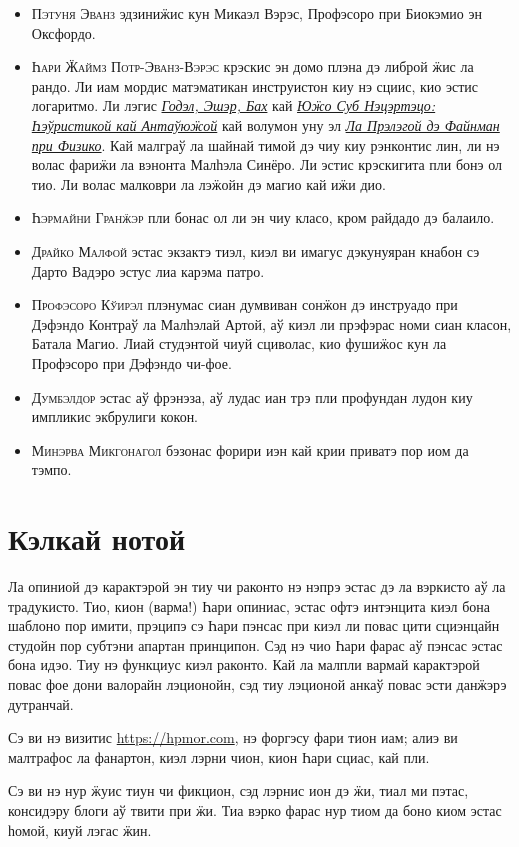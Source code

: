 \begin{itemize}
\item \textsc{Пэтуня Эванз} эдзиниӝис кун Микаэл Вэрэс, Профэсоро при Биокэмио эн Оксфордо.
\item \textsc{Һари Ӝаймз Потр-Эванз-Вэрэс} крэскис эн домо плэна дэ либрой ӝис ла рандо.
  Ли иам мордис матэматикан инструистон киу нэ сциис, кио эстис логаритмо.
  Ли лэгис \href{https://books.google.com/books?vid=ISBN9780465026562}{\emph{Годэл, Эшэр, Бах}}
  кай \href{https://books.google.com/books?vid=ISBN9780521284141}{\emph{Юӝо Суб Нэцэртэцо: Һэўристикой кай Антаўюӝой}}
  кай волумон уну эл \href{https://books.google.com/books?vid=ISBN9780201021158}{\emph{Ла Прэлэгой дэ Файнман при Физико}}.
  Кай малграў ла шайнай тимой дэ чиу киу рэнконтис лин, ли нэ волас фариӝи ла вэнонта Малһэла Синёро.
  Ли эстис крэскигита пли бонэ ол тио.
  Ли волас малковри ла лэӝойн дэ магио кай иӝи дио.
\item \textsc{Һэрмайни Гранӝэр} пли бонас ол ли эн чиу класо, кром райдадо дэ балаило.
\item \textsc{Драйко Малфой} эстас экзактэ тиэл, киэл ви имагус дэкунуяран кнабон сэ Дарто Вадэро эстус лиа карэма патро.
\item \textsc{Профэсоро Кўирэл} плэнумас сиан думвиван сонӝон дэ инструадо при Дэфэндо Контраў ла Малһэлай Артой, аў киэл ли прэфэрас номи сиан класон, Батала Магио.
  Лиай студэнтой чиуй сциволас, кио фушиӝос кун ла Профэсоро при Дэфэндо чи-фое.
\item \textsc{Думбэлдор} эстас аў фрэнэза, аў лудас иан трэ пли профундан лудон киу импликис экбрулиги кокон.
\item \textsc{Минэрва Микгонагол} бэзонас форири иэн кай крии приватэ пор иом да тэмпо.
\end{itemize}

%
%

\section*{Кэлкай нотой}

Ла опиниой дэ карактэрой эн тиу чи раконто нэ нэпрэ эстас дэ ла вэркисто аў ла традукисто.
Тио, кион (варма!) Һари опиниас, эстас офтэ интэнцита киэл бона шаблоно пор имити, прэципэ сэ Һари пэнсас при киэл ли повас цити сциэнцайн студойн пор субтэни апартан принципон.
Сэд нэ чио Һари фарас аў пэнсас эстас бона идэо.
Тиу нэ функциус киэл раконто.
Кай ла малпли вармай карактэрой повас фое дони валорайн лэционойн, сэд тиу лэционой анкаў повас эсти данӝэрэ дутранчай.

Сэ ви нэ визитис \url{https://hpmor.com}, нэ форгэсу фари тион иам; алиэ ви малтрафос ла фанартон, киэл лэрни чион, кион Һари сциас, кай пли.

Сэ ви нэ нур ӝуис тиун чи фикцион, сэд лэрнис ион дэ ӝи, тиал ми пэтас, консидэру блоги аў твити при ӝи.
Тиа вэрко фарас нур тиом да боно киом эстас һомой, киуй лэгас ӝин.

